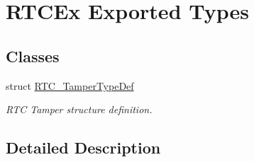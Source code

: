 \hypertarget{group___r_t_c_ex___exported___types}{}\section{R\+T\+C\+Ex Exported Types}
\label{group___r_t_c_ex___exported___types}
\subsection*{Classes}
\begin{DoxyCompactItemize}
\item 
struct \hyperlink{struct_r_t_c___tamper_type_def}{R\+T\+C\+\_\+\+Tamper\+Type\+Def}
\begin{DoxyCompactList}\small\item\em R\+TC Tamper structure definition. \end{DoxyCompactList}\end{DoxyCompactItemize}


\subsection{Detailed Description}

